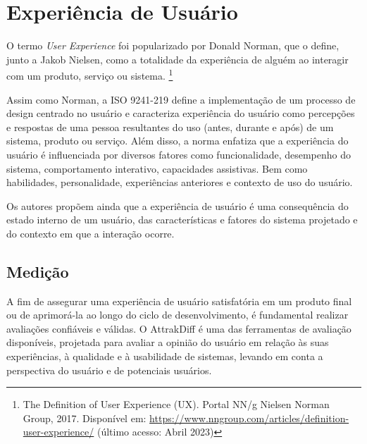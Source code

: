 \section{Experiência de Usuário}
\label{sec:Experiência de Usuário}

O termo \textit{User Experience} foi popularizado por Donald Norman, que o define, junto a Jakob Nielsen, como a totalidade da experiência de alguém ao interagir com um produto, 
serviço ou sistema. \footnote{The Definition of User Experience (UX). Portal NN/g Nielsen Norman Group, 2017. Disponível
em: \url{https://www.nngroup.com/articles/definition-user-experience/} (último acesso: Abril 2023)}

Assim como Norman, a ISO 9241-219 \cite{iso9241210} define a implementação de um processo de design centrado no usuário e caracteriza experiência do usuário como percepções e 
respostas de uma pessoa resultantes do uso (antes, durante e após) de um sistema, produto ou serviço. Além disso, a norma enfatiza que a experiência do usuário 
é influenciada por diversos fatores como funcionalidade, desempenho do sistema, comportamento interativo, capacidades assistivas. Bem como habilidades, 
personalidade, experiências anteriores e contexto de uso do usuário.

Os autores  propõem ainda que a experiência de usuário é uma consequência do estado interno de um usuário, das características e fatores do sistema projetado 
e do contexto em que a interação ocorre. 

\subsection{Medição}
\label{sec:Medição2}

A fim de assegurar uma experiência de usuário satisfatória em um produto final ou de aprimorá-la ao longo do ciclo de desenvolvimento, é fundamental realizar avaliações confiáveis e válidas. 
O AttrakDiff é uma das ferramentas de avaliação disponíveis, projetada para avaliar a opinião do usuário em relação às suas experiências, à qualidade e à usabilidade de sistemas, levando em 
conta a perspectiva do usuário e de potenciais usuários. 

